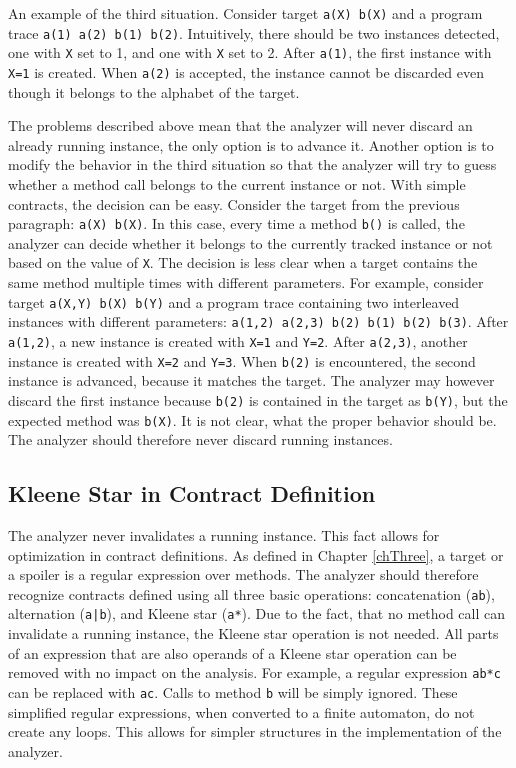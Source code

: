 An example of the third situation. Consider target \texttt{a(X) b(X)} and a
program trace \texttt{a(1) a(2) b(1) b(2)}. Intuitively, there should be two
instances detected, one with \texttt{X} set to 1, and one with \texttt{X} set to
2. After \texttt{a(1)}, the first instance with \texttt{X=1} is created. When
\texttt{a(2)} is accepted, the instance cannot be discarded even though it
belongs to the alphabet of the target.

The problems described above mean that the analyzer will never discard an
already running instance, the only option is to advance it. Another option is to
modify the behavior in the third situation so that the analyzer will try to
guess whether a method call belongs to the current instance or not. With simple
contracts, the decision can be easy. Consider the target from the previous
paragraph: \texttt{a(X) b(X)}. In this case, every time a method \texttt{b()} is
called, the analyzer can decide whether it belongs to the currently tracked
instance or not based on the value of \texttt{X}. The decision is less clear
when a target contains the same method multiple times with different parameters.
For example, consider target \texttt{a(X,Y) b(X) b(Y)} and a program trace
containing two interleaved instances with different parameters: \texttt{a(1,2)
a(2,3) b(2) b(1) b(2) b(3)}. After \texttt{a(1,2)}, a new instance is created
with \texttt{X=1} and \texttt{Y=2}. After \texttt{a(2,3)}, another instance is
created with \texttt{X=2} and \texttt{Y=3}. When \texttt{b(2)} is encountered,
the second instance is advanced, because it matches the target. The analyzer may
however discard the first instance because \texttt{b(2)} is contained in the
target as \texttt{b(Y)}, but the expected method was \texttt{b(X)}. It is not
clear, what the proper behavior should be. The analyzer should therefore never
discard running instances.

\subsection{Kleene Star in Contract Definition}

The analyzer never invalidates a running instance. This fact allows for
optimization in contract definitions. As defined in Chapter \ref{chThree}, a
target or a spoiler is a regular expression over methods. The analyzer should
therefore recognize contracts defined using all three basic operations:
concatenation (\texttt{ab}), alternation (\texttt{a|b}), and Kleene star
(\texttt{a*}). Due to the fact, that no method call can invalidate a running
instance, the Kleene star operation is not needed. All parts of an expression
that are also operands of a Kleene star operation can be removed with no impact
on the analysis. For example, a regular expression \texttt{ab*c} can be replaced
with \texttt{ac}. Calls to method \texttt{b} will be simply ignored. These
simplified regular expressions, when converted to a finite automaton, do not
create any loops. This allows for simpler structures in the implementation of
the analyzer.

